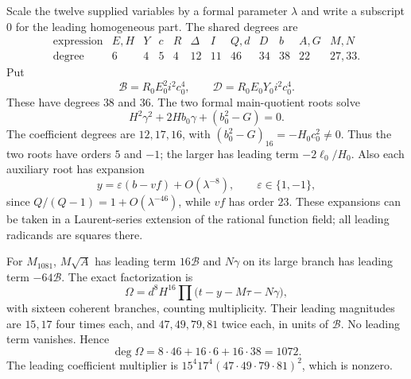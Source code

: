 \documentclass[11pt,letterpaper]{article}
\theoremstyle{remark}
\begin{document}
Scale the twelve supplied variables by a formal parameter $\lambda$ and
write a subscript $0$ for the leading homogeneous part. The shared degrees
are
\[
 \begin{array}{c|rrrrrrrrrrr}
 \text{expression}&E,H&Y&c&R&\Delta&I&Q,d&D&b&A,G&M,N\\
 \hline
 \text{degree}&6&4&5&4&12&11&46&34&38&22&27,33.
 \end{array}
\]
Put
\[
 \mathcal B=R_0E_0^2i^2c_0^4,\qquad
 \mathcal D=R_0E_0Y_0i^2c_0^4.
\]
These have degrees $38$ and $36$.
The two formal main-quotient roots solve
\[
 H^2\gamma^2+2Hb_0\gamma+(b_0^2-G)=0.
\]
The coefficient degrees are $12,17,16$, with
$(b_0^2-G)_{16}=-H_0c_0^2\ne0$. Thus the two roots have orders $5$ and
$-1$; the larger has leading term $-2\ell_0/H_0$.
Also each auxiliary root has expansion
\[
 y=\varepsilon(b-vf)+O(\lambda^{-8}),\qquad \varepsilon\in\{1,-1\},
\]
since $Q/(Q-1)=1+O(\lambda^{-46})$, while $vf$ has order $23$.
These expansions can be taken in a Laurent-series extension of the
rational function field; all leading radicands are squares there.

For $M_{1081}$, $M\sqrt A$ has leading term $16\mathcal B$ and
$N\gamma$ on its large branch has leading term $-64\mathcal B$.
The exact factorization is
\begin{equation}
 \Omega=d^8H^{16}
  \prod\bigl(t-y-M\tau-N\gamma\bigr),
 \label{eq:16factor}
\end{equation}
with sixteen coherent branches, counting multiplicity. Their leading
magnitudes are $15,17$ four times each, and $47,49,79,81$ twice each,
in units of $\mathcal B$. No leading term vanishes. Hence
\[
 \deg\Omega=8\cdot46+16\cdot6+16\cdot38=1072.
\]
The leading coefficient multiplier is
$15^4 17^4(47\cdot49\cdot79\cdot81)^2$, which is nonzero.
\end{document}
